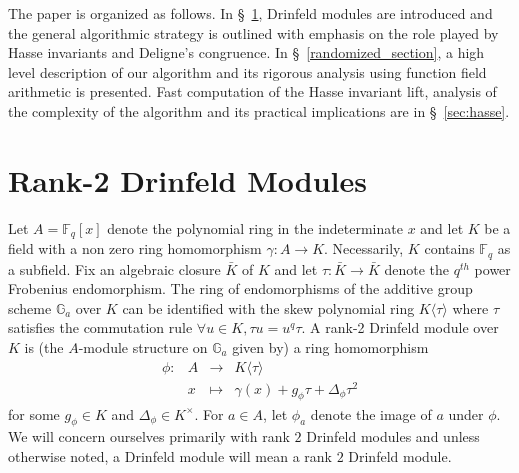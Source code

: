 \documentclass[12pt]{article}
\theoremstyle{plain}
\theoremstyle{definition}
\newcommand{\ang}[1]{\langle#1\rangle}
\def\F{\ensuremath{\mathbb{F}}}
\begin{document}
The paper is organized as follows. In \S~\ref{drinfeld_section}, Drinfeld modules are introduced 
and the general algorithmic strategy is outlined with emphasis on the role played by Hasse 
invariants and Deligne's congruence. In \S~\ref{randomized_section}, a high level description of 
our algorithm and its rigorous analysis using function field arithmetic is presented. Fast 
computation of the Hasse invariant lift, analysis of the complexity of the algorithm and its 
practical implications are in \S~\ref{sec:hasse}. 
 
 

\section{Rank-2 Drinfeld Modules}\label{drinfeld_section}
 Let $A=\F_q[x]$ denote the polynomial ring in the indeterminate $x$ and let $K$ be a field with a 
 non zero ring homomorphism $\gamma:A \rightarrow K$. Necessarily, $K$ contains $\F_q$ as a 
 subfield. Fix an algebraic closure $\bar{K}$ of $K$ and let $\tau: \bar{K} \longrightarrow 
 \bar{K}$ denote the $q^{th}$ power Frobenius endomorphism. The ring of endomorphisms of the 
 additive group scheme $\mathbb{G}_a$ over $K$ can be identified with the skew polynomial ring 
 $K\langle \tau \rangle$ where $\tau$ satisfies the commutation rule $\forall u \in K, \tau u = u^q 
 \tau$.
A rank-2 Drinfeld module over $K$ is (the $A$-module structure on $\mathbb{G}_a$ given by) a ring 
homomorphism
\[
\begin{array}{rlll}
	\phi : & A & \longrightarrow & K\ang{\tau} \\
	& x & \longmapsto & \gamma(x) + g_\phi \tau + \Delta_\phi \tau^2	
\end{array}
\]
for some $g_\phi \in K$ and $\Delta_\phi \in K^\times$. For $a \in A$, let $\phi_a$ denote the 
image of $a$ under $\phi$. We will concern ourselves primarily with rank $2$ Drinfeld modules and 
unless otherwise noted, a Drinfeld module will mean a rank $2$ Drinfeld module.\\ \\
\end{document}
